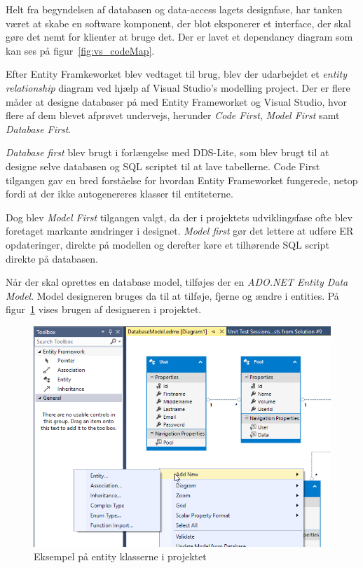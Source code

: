 Helt fra begyndelsen af databasen og data-access lagets designfase, har tanken været at skabe en software komponent, der blot eksponerer et interface, der skal gøre det nemt for klienter at bruge det. Der er lavet et dependancy diagram som kan ses på figur~\ref{fig:vs_codeMap}.

Efter Entity Framkeworket blev vedtaget til brug, blev der udarbejdet et \textit{entity relationship} diagram ved hjælp af Visual Studio's modelling project. Der er flere måder at designe databaser på med Entity Frameworket og Visual Studio, hvor flere af dem blevet afprøvet undervejs, herunder \textit{Code First}, \textit{Model First} samt \textit{Database First}.

\textit{Database first} blev brugt i forlængelse med DDS-Lite, som blev brugt til at designe selve databasen og SQL scriptet til at lave tabellerne. Code First tilgangen gav en bred forståelse for hvordan Entity Frameworket fungerede, netop fordi at der ikke autogenereres klasser til entiteterne.

Dog blev \textit{Model First} tilgangen valgt, da der i projektets udviklingsfase ofte blev foretaget markante ændringer i designet. \textit{Model first} gør det lettere at udføre ER opdateringer, direkte på modellen og derefter køre et tilhørende SQL script direkte på databasen. 

Når der skal oprettes en database model, tilføjes der en \textit{ADO.NET Entity Data Model}. Model designeren bruges da til at tilføje, fjerne og ændre i entities.
På figur~\ref{fig:modelDesigner} vises brugen af designeren i projektet.

\begin{figure}
	\centering
	\includegraphics[width=\linewidth]{figs/modelDesigner}
	\caption{Eksempel på entity klasserne i projektet}
	\label{fig:modelDesigner}
\end{figure}

